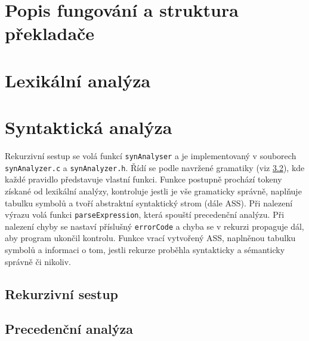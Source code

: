 \documentclass[a4paper, 12pt]{article}
\begin{document}
    \section{Popis fungování a struktura překladače}

    \section{Lexikální analýza}

    \section{Syntaktická analýza}
    Rekurzivní sestup se volá funkcí \texttt{synAnalyser} a je implementovaný v souborech \texttt{synAnalyzer.c} a \texttt{synAnalyzer.h}. Řídí se podle navržené gramatiky (viz \ref{}), kde každé pravidlo představuje vlastní funkci. Funkce postupně prochází tokeny získané od lexikální analýzy, kontroluje jestli je vše gramaticky správně, naplňuje tabulku symbolů a tvoří abstraktní syntaktický strom (dále ASS). Při nalezení výrazu volá funkci \texttt{parseExpression}, která spouští precedenční analýzu. Při nalezení chyby se nastaví příslušný \texttt{errorCode} a chyba se v rekurzi propaguje dál, aby program ukončil kontrolu. Funkce vrací vytvořený ASS, naplněnou tabulku symbolů a informaci o tom, jestli rekurze proběhla syntakticky a sémanticky správně či nikoliv.

    \subsection{Rekurzivní sestup} \label{sestup}

    \subsection{Precedenční analýza}
\end{document}
